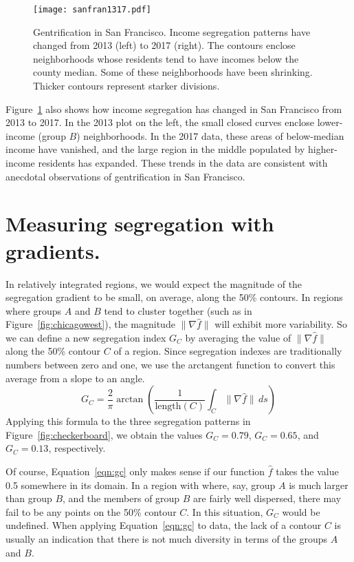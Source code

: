 \documentclass{article}
\theoremstyle{theorem}
\theoremstyle{definition}
\begin{document}
\begin{figure}
  \texttt{[image: sanfran1317.pdf]} %
  \caption{Gentrification in San Francisco. Income segregation patterns have changed from 2013 (left) to 2017 (right). The contours enclose neighborhoods whose residents tend to have incomes below the county median. Some of these neighborhoods have been shrinking. Thicker contours represent starker divisions.}
  \label{fig:sanfran1317}
\end{figure}

Figure~\ref{fig:sanfran1317} also shows how income segregation has changed in San Francisco from 2013 to 2017. In the 2013 plot on the left, the small closed curves enclose lower-income (group $B$) neighborhoods. In the 2017 data, these areas of below-median income have vanished, and the large region in the middle populated by higher-income residents has expanded. These trends in the data are consistent with anecdotal observations of gentrification in San Francisco. \cite{pogash15}

\section{Measuring segregation with gradients.}

In relatively integrated regions, we would expect the magnitude of the segregation gradient to be small, on average, along the 50\% contours. In regions where groups $A$ and $B$ tend to cluster together (such as in Figure~\ref{fig:chicagowest}), the magnitude $\lVert \nabla \hat{f} \rVert$ will exhibit more variability. So we can define a new segregation index $G_C$ by averaging the value of  $\lVert \nabla \hat{f} \rVert$ along the 50\% contour $C$ of a region. Since segregation indexes are traditionally numbers between zero and one, we use the arctangent function to convert this average from a slope to an angle.
\begin{equation}\label{eqn:gc}
   G_C = \frac{2}{\pi} \arctan \left(\frac{1}{\mathrm{length}(C)} \int_C \lVert \nabla \hat{f} \rVert \, ds \right)
\end{equation}
Applying this formula to the three segregation patterns in Figure~\ref{fig:checkerboard}, we obtain the values $G_C=0.79$, $G_C=0.65$, and $G_C=0.13$, respectively.

Of course, Equation~\ref{eqn:gc} only makes sense if our function $\hat{f}$ takes the value 0.5 somewhere in its domain. In a region with where, say, group $A$ is much larger than group $B$, and the members of group $B$ are fairly well dispersed, there may fail to be any points on the 50\% contour $C$. In this situation, $G_C$ would be undefined. When applying Equation~\ref{eqn:gc} to data, the lack of a contour $C$ is usually an indication that there is not much diversity in terms of the groups $A$ and $B$.
\end{document}
